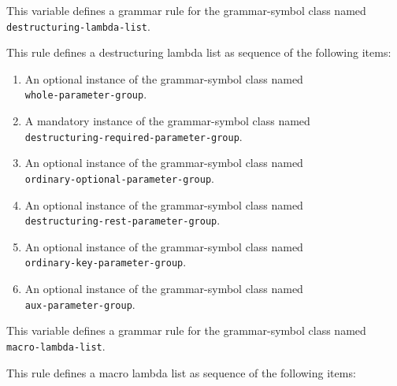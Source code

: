 
This variable defines a grammar rule for the grammar-symbol class
named \texttt{destructuring-lambda-list}.

This rule defines a destructuring lambda list as sequence of the
following items:

\begin{enumerate}
\item An optional instance of the grammar-symbol class named\\
  \texttt{whole-parameter-group}.
\item A mandatory instance of the grammar-symbol class named\\
  \texttt{destructuring-required-parameter-group}.
\item An optional instance of the grammar-symbol class named\\
  \texttt{ordinary-optional-parameter-group}.
\item An optional instance of the grammar-symbol class named\\
\texttt{destructuring-rest-parameter-group}.
\item An optional instance of the grammar-symbol class named\\
\texttt{ordinary-key-parameter-group}.
\item An optional instance of the grammar-symbol class named\\
\texttt{aux-parameter-group}.
\end{enumerate}


This variable defines a grammar rule for the grammar-symbol class
named \texttt{macro-lambda-list}.

This rule defines a macro lambda list as sequence of the
following items:

